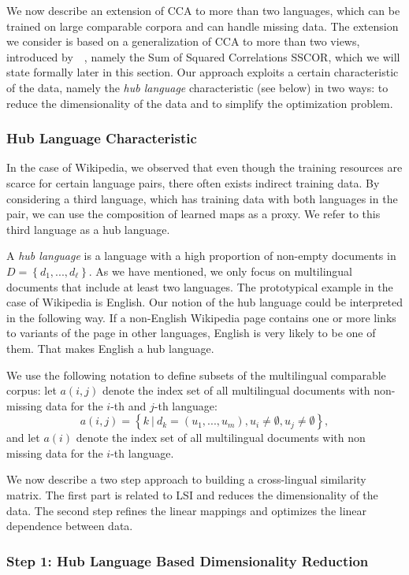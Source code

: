 \documentclass[twoside,11pt]{article}
\begin{document}
We now describe an extension of CCA to more than two languages, which can be trained on large comparable corpora and can handle missing data.
 The extension we consider is based on a generalization of CCA to more than two views, introduced by~\citeauthor{Kettenring}~\citeyear{Kettenring}, namely the Sum of Squared Correlations SSCOR, which we will state formally later in this section. Our approach exploits a certain characteristic of the data, namely the \emph{hub language} characteristic (see below) in two
 ways: to reduce the dimensionality of the data and to simplify the optimization problem.

\subsubsection{Hub Language Characteristic}
In the case of Wikipedia, we observed that even though the training resources are scarce for certain language pairs, there often exists indirect training data. By considering a third language, which has training data with both languages in the pair,  we can use the composition of learned maps as a proxy. We refer to this third language as a hub language.

A \emph{hub language} is a language with a high proportion of non-empty documents in $D = \left\{d_1,..., d_{\ell}\right\}$. As we have mentioned, we only focus on multilingual documents that include at least two languages. The prototypical example in the case of Wikipedia is English. Our notion of the hub language could be interpreted in the following way.
If a non-English Wikipedia page contains one or more links to variants of the page in other languages, English is very likely to be one of them. That makes English a hub language.

We use the following notation to define subsets of the multilingual comparable corpus: let $a(i,j)$ denote the index set of all multilingual documents with non-missing data for the $i$-th and $j$-th language:  $$a(i,j) = \left\{k~ |~ d_k = (u_1,...,u_m), u_i \neq \emptyset, u_j \neq \emptyset \right\},$$ and let $a(i)$ denote the index set of all multilingual documents with non missing data for the $i$-th language.

We now describe a two step approach to building a cross-lingual similarity matrix. The first part is related to LSI and reduces the dimensionality of the data. The second step refines the linear mappings and optimizes the linear dependence between data.

\subsubsection{Step 1: Hub Language Based Dimensionality Reduction}
\end{document}
